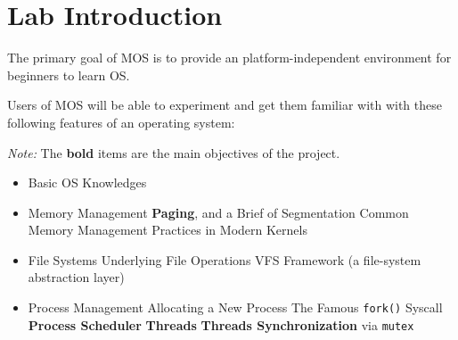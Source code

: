 \chapter{Lab Introduction}

The primary goal of MOS is to provide an platform-independent environment for beginners to learn OS.

Users of MOS will be able to experiment and get them familiar with with these following features
of an operating system:

\textit{Note:} The \textbf{bold} items are the main objectives of the project.

\begin{itemize}
    \item Basic OS Knowledges
    \item Memory Management
          \subitem \textbf{Paging}, and a Brief of Segmentation
          \subitem Common Memory Management Practices in Modern Kernels
    \item File Systems
          \subitem Underlying File Operations
          \subitem VFS Framework (a file-system abstraction layer)
    \item Process Management
          \subitem Allocating a New Process
          \subitem The Famous \texttt{fork()} Syscall
          \subitem \textbf{Process Scheduler}
          \subitem \textbf{Threads}
          \subitem \textbf{Threads Synchronization} via \texttt{mutex}
\end{itemize}
